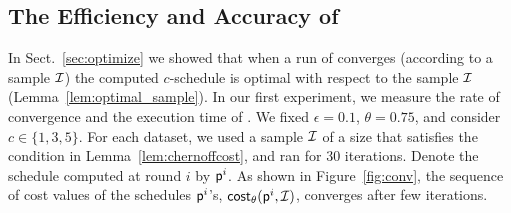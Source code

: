 
\subsection{The Efficiency and Accuracy of \algonameapx}
In Sect.~\ref{sec:optimize} we showed that when a run of \algonameapx converges
(according to a sample $\mathcal{I}$) the computed $c$-schedule is optimal with
respect to the sample $\mathcal{I}$ (Lemma~\ref{lem:optimal_sample}). In our first
experiment, we measure the rate of convergence and the execution time of
\algonameapx. We fixed $\epsilon=0.1$, $\theta=0.75$, and consider
$c\in\{1,3,5\}$. For each dataset, we used a sample $\mathcal{I}$ of a size that
satisfies the condition in Lemma~\ref{lem:chernoffcost}, and ran \algonameapx
for 30 iterations. Denote the schedule computed at round $i$ by $\mathsf{p}^i$.
As shown in Figure~\ref{fig:conv}, the sequence of cost values of the schedules
$\mathsf{p}^i$'s, $\mathsf{cost}_\theta(\mathsf{p}^i,\mathcal{I})$, converges after few iterations.


%
%
%
%
%
%




